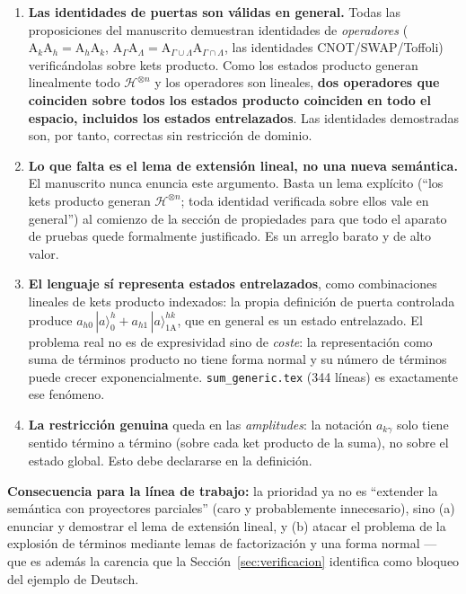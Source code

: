 \documentclass[12pt, a4paper]{article}
\newcommand{\gate}[1]{\text{#1}}
\newcommand{\stateket}[3]{\ket{#1}^{#2}_{#3}}
\newcommand{\ket}[1]{|#1\rangle}
\begin{document}
\begin{enumerate}
  \item \textbf{Las identidades de puertas son válidas en general.}
        Todas las proposiciones del manuscrito demuestran identidades de
        \emph{operadores} ($\gate{A}_k\gate{A}_h = \gate{A}_h\gate{A}_k$,
        $\gate{A}_\Gamma \gate{A}_\Lambda = \gate{A}_{\Gamma\cup\Lambda}
        \gate{A}_{\Gamma\cap\Lambda}$, las identidades CNOT/SWAP/Toffoli)
        verificándolas sobre kets producto. Como los estados producto generan
        linealmente todo $\mathcal{H}^{\otimes n}$ y los operadores son
        lineales, \textbf{dos operadores que coinciden sobre todos los
          estados producto coinciden en todo el espacio, incluidos los estados
          entrelazados}. Las identidades demostradas son, por tanto, correctas
        sin restricción de dominio.

  \item \textbf{Lo que falta es el lema de extensión lineal, no una nueva
          semántica.} El manuscrito nunca enuncia este argumento. Basta un lema
        explícito (``los kets producto generan $\mathcal{H}^{\otimes n}$;
        toda identidad verificada sobre ellos vale en general'') al comienzo
        de la sección de propiedades para que todo el aparato de pruebas
        quede formalmente justificado. Es un arreglo barato y de alto valor.

  \item \textbf{El lenguaje sí representa estados entrelazados}, como
        combinaciones lineales de kets producto indexados: la propia
        definición de puerta controlada produce
        $a_{h0}\,\stateket{a}{h}{0} + a_{h1}\,\stateket{a}{hk}{1\gate{A}}$,
        que en general es un estado entrelazado. El problema real no es de
        expresividad sino de \emph{coste}: la representación como suma de
        términos producto no tiene forma normal y su número de términos puede
        crecer exponencialmente. \texttt{sum\_generic.tex} (344 líneas) es
        exactamente ese fenómeno.

  \item \textbf{La restricción genuina} queda en las \emph{amplitudes}: la
        notación $a_{k\gamma}$ solo tiene sentido término a término (sobre
        cada ket producto de la suma), no sobre el estado global. Esto debe
        declararse en la definición.
\end{enumerate}

\textbf{Consecuencia para la línea de trabajo:} la prioridad ya no es
``extender la semántica con proyectores parciales'' (caro y probablemente
innecesario), sino (a) enunciar y demostrar el lema de extensión lineal, y
(b) atacar el problema de la explosión de términos mediante lemas de
factorización y una forma normal --- que es además la carencia que la
Sección~\ref{sec:verificacion} identifica como bloqueo del ejemplo de Deutsch.
\end{document}
